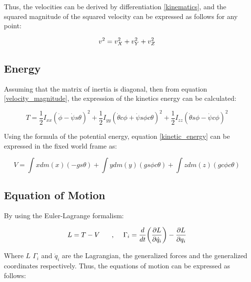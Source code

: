 \documentclass{thesisreport}
\begin{document}
Thus, the velocities can be derived by differentiation \ref{kinematics}, and the squared magnitude of the squared velocity can be expressed as follows for any point:

\begin{equation}\label{velocity_magnitude}
	v^2 = v_X^2 + v_Y^2 + v_Z^2\\
\end{equation} 

\subsection{Energy}

Assuming that the matrix of inertia is diagonal, then from equation \ref{velocity_magnitude}, the expression of the kinetics energy can be calculated:

\begin{equation}\label{kinetic_energy}
T = \frac{1}{2} I_{xx}(\dot{\phi}-\dot{\psi} s \theta)^2 + \frac{1}{2} I_{yy}(\dot{\theta} c \phi + \dot{\psi} s \phi c \theta)^2 + \frac{1}{2} I_{zz}(\dot{\theta} s \phi - \dot{\psi} c \phi)^2
\end{equation}

Using the formula of the potential energy, equation \ref{kinetic_energy} can be expressed in the fixed world frame as: 

\begin{equation}\label{potential_energy}
V = \int xdm(x)(-g s \theta) + \int ydm(y)(g s \phi c \theta) + \int z dm (z) (g c \phi c \theta) 
\end{equation}

\newpage

\subsection{Equation of Motion}

By using the Euler-Lagrange formalism:


\begin{equation}
L = T - V \text{\hspace{0.5cm} ,\hspace{0.5cm}} \Gamma_i = \frac{d}{dt}\bigg(\frac{\partial L}{\partial \dot{q}_i}\bigg) - \frac{\partial L}{\partial q_i}
\end{equation}
 
 Where $L$ $\Gamma_i$ and $\dot{q}_i$ are the Lagrangian, the generalized forces and the generalized coordinates respectively. Thus, the equations of motion can be expressed as follows: 
 
\end{document}
